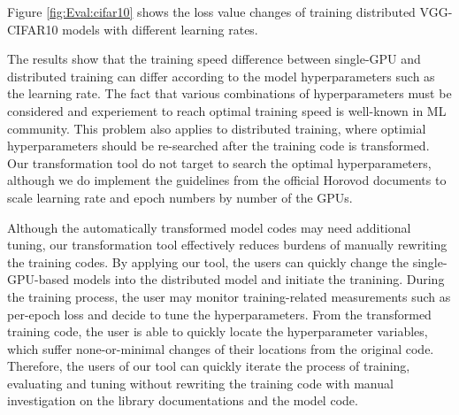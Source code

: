 Figure \ref{fig:Eval:cifar10} shows the loss value changes of training 
distributed VGG-CIFAR10 models with different learning rates.

The results show that the training speed difference between single-GPU and
distributed training can differ according to the model hyperparameters
such as the learning rate. The fact that various combinations of hyperparameters
must be considered and experiement to reach optimal training speed is 
well-known in ML community. This problem also applies to distributed training,
where optimial hyperparameters should be re-searched after the training
code is transformed. Our transformation tool do not target to search the 
optimal hyperparameters, although we do implement the guidelines from the
official Horovod documents to scale learning rate and epoch numbers
by number of the GPUs.  

Although the automatically transformed model codes may need additional
tuning, our transformation tool effectively reduces
burdens of manually rewriting the training codes.
By applying our tool, the users can quickly change the single-GPU-based
models into the distributed model and initiate the tranining.
During the training process, the user may monitor training-related measurements
such as per-epoch loss and decide to tune the hyperparameters.
From the transformed training code, the user is able to quickly locate the
hyperparameter variables, which suffer none-or-minimal changes of their locations
from the original code.
Therefore, the users of our tool can quickly iterate the process of
training, evaluating and tuning without rewriting the
training code with manual investigation on the library documentations and
the model code.
